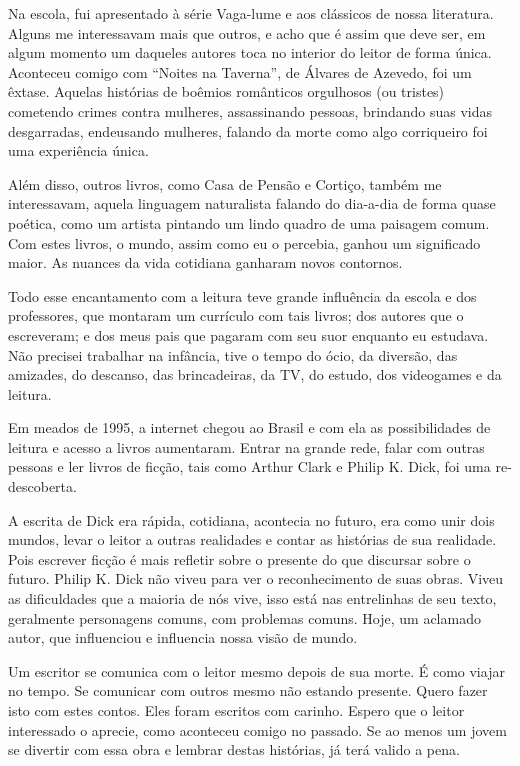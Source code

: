 \documentclass[a4paper,14pt]{book}
\begin{document}
Na escola, fui apresentado à série Vaga-lume e aos clássicos de nossa literatura. Alguns me interessavam mais que outros, e acho que é assim que deve ser, em algum momento um daqueles autores toca no interior do leitor de forma única. Aconteceu comigo com “Noites na Taverna”, de Álvares de Azevedo, foi um êxtase. Aquelas histórias de boêmios românticos orgulhosos (ou tristes) cometendo crimes contra mulheres, assassinando pessoas, brindando  suas vidas desgarradas, endeusando mulheres, falando da morte como algo corriqueiro foi uma experiência única.

Além disso, outros livros, como Casa de Pensão e Cortiço, também me interessavam, aquela linguagem naturalista falando do dia-a-dia de forma quase poética, como um artista pintando um lindo quadro de uma paisagem comum. Com estes livros, o mundo, assim como eu o percebia, ganhou um significado maior. As nuances da vida cotidiana ganharam novos contornos.

Todo esse encantamento com a leitura teve grande influência da escola e dos professores, que montaram um currículo com tais livros; dos autores que o escreveram; e dos meus pais que pagaram com seu suor enquanto eu estudava. Não precisei trabalhar na infância, tive o tempo do ócio, da diversão, das amizades, do descanso, das brincadeiras, da TV, do estudo, dos videogames e da leitura. 

Em meados de 1995, a internet chegou ao Brasil e com ela as possibilidades de leitura e acesso a livros aumentaram. Entrar na grande rede, falar com outras pessoas e ler livros de ficção, tais como Arthur Clark e Philip K. Dick, foi uma re-descoberta.

A escrita de Dick era rápida, cotidiana, acontecia no futuro, era como unir dois mundos, levar o leitor a outras realidades e contar as histórias de sua realidade. Pois escrever ficção é mais refletir sobre o presente do que discursar sobre o futuro. Philip K. Dick não viveu para ver o reconhecimento de suas obras. Viveu as dificuldades que a maioria de nós vive, isso está nas entrelinhas de seu texto, geralmente personagens comuns, com problemas comuns. Hoje, um aclamado autor, que influenciou e influencia nossa visão de mundo.

Um escritor se comunica com o leitor mesmo depois de sua morte.
É como viajar no tempo. Se comunicar com outros mesmo não estando presente. Quero fazer isto com estes contos. Eles foram escritos com carinho. Espero que o leitor interessado o aprecie, como aconteceu comigo no passado. Se ao menos um jovem se divertir com essa obra e lembrar destas histórias, já terá valido a pena.
\end{document}
